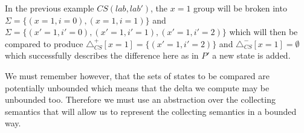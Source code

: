  In the previous example $CS(lab,lab')$, the $x=1$ group will be broken into $\Sigma = \{ (x=1,i=0), (x=1,i=1) \}$ and $\Sigma = \{(x'=1,i'=0), (x'=1,i'=1), (x'=1,i'=2)\}$ which will then be compared to produce $\triangle_{CS}^{+}[x=1] = \{(x'=1,i'=2)\}$ and $\triangle_{CS}^{-}[x=1] = \emptyset$ which successfully describes the difference here as in $P'$ a new state is added.

We must remember however, that the sets of states to be compared are potentially unbounded which means that the delta we compute may be unbounded too. Therefore we must use an abstraction over the collecting semantics that will allow us to represent the collecting semantics in a bounded way.
